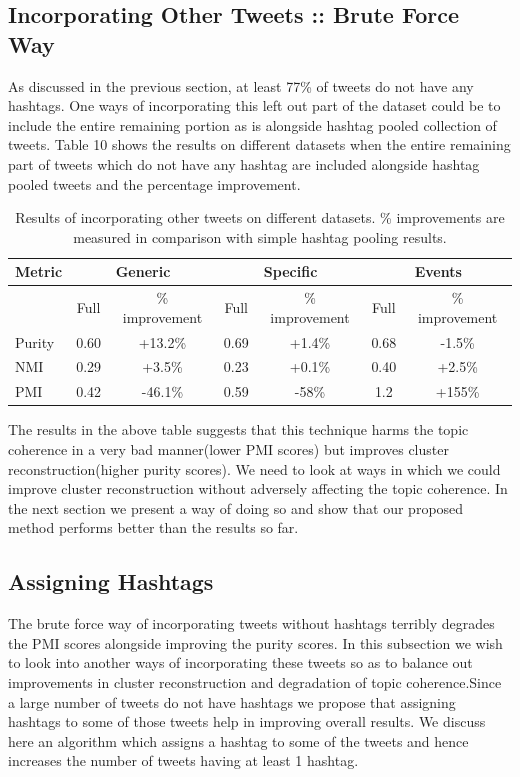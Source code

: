 \documentclass[10pt,a5paper,twoside]{article}
\begin{document}
\subsection{Incorporating Other Tweets :: Brute Force Way}

As discussed in the previous section, at least 77\% of tweets do not have any hashtags. One ways of incorporating this left out part of the dataset could be to include the entire remaining portion as is alongside hashtag pooled collection of tweets. Table 10 shows the results on different datasets when the entire remaining part of tweets which do not have any hashtag are included alongside hashtag pooled tweets and the percentage improvement. 

\begin{table}[!h]
\setcounter{table}{9}
\centering
\resizebox{14cm}{!} 
{
	\begin{tabular}{|l|cc|cc|cc|}
	\hline
	Metric  & \multicolumn {2}{c}{Generic} & \multicolumn {2}{c}{Specific} & \multicolumn {2}{c|}{Events}\\
	\hline
	 & Full & \% improvement & Full & \% improvement & Full & \% improvement\\
	\hline
	Purity & 0.60 & +13.2\% & 0.69 & +1.4\% & 0.68 & -1.5\% \\
	\hline
	NMI & 0.29 & +3.5\% & 0.23 & +0.1\% & 0.40 & +2.5\% \\
	\hline
	PMI & 0.42 & -46.1\% & 0.59 & -58\% & 1.2 & +155\% \\
	\hline
	\end{tabular}
}
\caption{Results of incorporating other tweets on different datasets. \% improvements are measured in comparison with simple hashtag pooling results.}\label{Table}
\end{table}

The results in the above table suggests that this technique harms the topic coherence in a very bad manner(lower PMI scores) but improves cluster reconstruction(higher purity scores). We need to look at ways in which we could improve cluster reconstruction without adversely affecting the topic coherence. In the next section we present a way of doing so and show that our proposed method performs better than the results so far.

\subsection{Assigning Hashtags}
The brute force way of incorporating tweets without hashtags terribly degrades the PMI scores alongside improving the purity scores. In this subsection we wish to look into another ways of incorporating these tweets so as to balance out improvements in cluster reconstruction and degradation of topic coherence.Since a large number of tweets do not have hashtags we propose that assigning hashtags to some of those tweets help in improving overall results. We discuss here an algorithm which assigns a hashtag to some of the tweets and hence increases the number of tweets having at least 1 hashtag.
\end{document}
